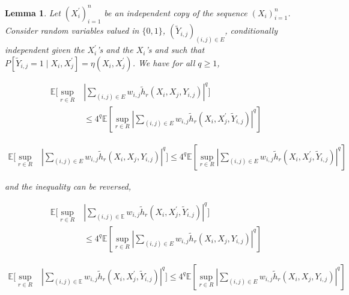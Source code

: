 \documentclass[letterpaper]{article} %
\def\DoubleColumn{}
\def\DoubleColumnEnd{}
\def\SingleColumn{}
\def\SingleColumnEnd{}
\newtheorem{lemma}{Lemma}
\newcommand{\E}{\mathbb{E}}
\newcommand{\Pro}{P}
\newcommand{\pair}[1]{(#1)}
\begin{document}
\begin{lemma}
    \label{le:weighted_decoupling_undecoupling}
    Let $(X_i^\prime)_{i=1}^n$ be an independent copy of the sequence $(X_i)_{i=1}^n$. Consider random variables valued in $\{0,1\}$, $(\tilde{Y}_{i,j})_{\pair{i,j}\in E}$, conditionally independent given the $X_i^\prime$'s and the $X_i$'s and such that $\Pro[\tilde{Y}_{i,j}=1\mid X_i,X_j^\prime]=\eta(X_i, X_j^\prime)$. We have for all $q\ge 1$,
    \DoubleColumn
    \begin{equation}
        \begin{aligned}
        \label{eq:weighted_u_statistics_decoupling}
            \E[\sup_{r\in R}&|\sum_{\pair{i,j}\in E}w_{i,j} \tilde{h}_r(X_i,X_j, Y_{i,j})|^q] \\
            &\le 4^q\E[\sup_{r\in R}|\sum_{\pair{i,j}\in E} w_{i,j}\tilde{h}_r(X_i,X_j^\prime, \tilde{Y}_{i,j})|^q]
        \end{aligned}
    \end{equation}
    \DoubleColumnEnd
    \SingleColumn
    \begin{equation}
        \begin{aligned}
        \label{eq:weighted_u_statistics_decoupling}
            \E[\sup_{r\in R}&|\sum_{\pair{i,j}\in E}w_{i,j} \tilde{h}_r(X_i,X_j, Y_{i,j})|^q] \le 4^q\E[\sup_{r\in R}|\sum_{\pair{i,j}\in E} w_{i,j}\tilde{h}_r(X_i,X_j^\prime, \tilde{Y}_{i,j})|^q]
        \end{aligned}
    \end{equation}
    \SingleColumnEnd
    and the inequality can be reversed,
    \DoubleColumn
    \begin{equation}
        \begin{aligned}
        \label{eq:weighted_u_statistic_coupling}
        \E[\sup_{r\in R}&|\sum_{\pair{i,j}\in\E}w_{i,j} \tilde{h}_r(X_i,X_j^\prime, \tilde{Y}_{i,j})|^q]\\
        &\le 4^q \E[\sup_{r\in R}|\sum_{\pair{i,j}\in E}w_{i,j} \tilde{h}_r(X_i,X_j,Y_{i,j})|^q]
        \end{aligned}
    \end{equation}
    \DoubleColumnEnd
    \SingleColumn
    \begin{equation}
        \begin{aligned}
        \label{eq:weighted_u_statistic_coupling}
        \E[\sup_{r\in R}&|\sum_{\pair{i,j}\in\E}w_{i,j} \tilde{h}_r(X_i,X_j^\prime, \tilde{Y}_{i,j})|^q] \le 4^q \E[\sup_{r\in R}|\sum_{\pair{i,j}\in E}w_{i,j} \tilde{h}_r(X_i,X_j,Y_{i,j})|^q]
        \end{aligned}
    \end{equation}
    \SingleColumnEnd
\end{lemma}
\end{document}
